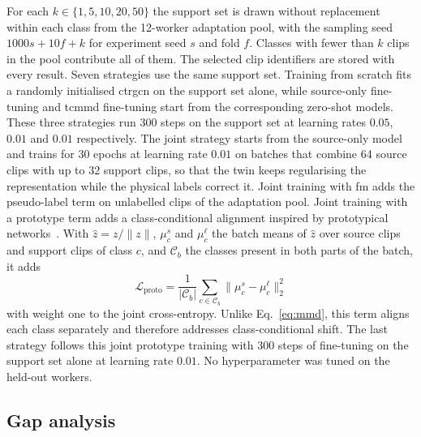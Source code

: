 \documentclass[Royal,sagev,times]{sagej}
\begin{document}
For each $k\in\{1,5,10,20,50\}$ the support set is drawn without replacement
within each class from the 12-worker adaptation pool, with the sampling seed
$1000s+10f+k$ for experiment seed $s$ and fold $f$. Classes with fewer than $k$
clips in the pool contribute all of them. The selected clip identifiers are
stored with every result. Seven strategies use the same support set. Training
from scratch fits a randomly initialised \ac{ctrgcn} on the support set alone,
while source-only fine-tuning and \ac{tcmmd} fine-tuning start from the
corresponding zero-shot models. These three strategies run 300 steps on the
support set at learning rates $0.05$, $0.01$ and $0.01$ respectively. The
joint strategy starts from the source-only model and trains for 30 epochs at
learning rate $0.01$ on batches that combine 64 source clips with up to 32
support clips, so that the twin keeps regularising the representation while
the physical labels correct it. Joint training with \ac{fm} adds the
pseudo-label term on unlabelled clips of the adaptation pool. Joint training
with a prototype term adds a class-conditional alignment inspired by
prototypical networks~\cite{snell2017prototypical}. With $\hat{z}=z/\|z\|$,
$\mu_c^s$ and $\mu_c^\ell$ the batch means of $\hat{z}$ over source clips and
support clips of class $c$, and $\mathcal{C}_b$ the classes present in both
parts of the batch, it adds
\begin{equation}
  \mathcal{L}_{\mathrm{proto}}=\frac{1}{|\mathcal{C}_b|}\sum_{c\in\mathcal{C}_b}
  \bigl\|\mu_c^s-\mu_c^\ell\bigr\|_2^2
  \label{eq:proto}
\end{equation}
with weight one to the joint cross-entropy. Unlike Eq.~\ref{eq:mmd}, this term
aligns each class separately and therefore addresses class-conditional shift.
The last strategy follows this joint prototype training with 300 steps of
fine-tuning on the support set alone at learning rate $0.01$. No
hyperparameter was tuned on the held-out workers.

\subsection{Gap analysis}
\end{document}
